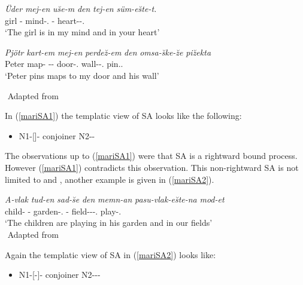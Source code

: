 \begin{exe}
    \ex \label{mariSA1}
    \begin{xlist}
        \ex
        \gll
        \textit{Üder} \textit{mej-en} \textit{u\u{s}e-m} \textit{den} \textit{tej-en} \textit{süm-e\u{s}te-t.} \\ girl {\First}{\Sg}-{\Gen} mind-{\Poss}.{\First}{\Sg} {\And} {\Second}{\Sg}-{\Gen} heart-{\Iness}-{\Second}{\Sg}.{\Poss} \\
        \glt `The girl is in my mind and in your heart'
        
        \ex 
        \gll 
        \textit{Pjötr} \textit{kart-em} \textit{mej-en} \textit{perde\u{z}-em} \textit{den} \textit{omsa-\u{s}ke-\u{z}e} \textit{pi\u{z}ekta} \\ Peter map-{\Acc} {\First}{\Sg}-{\Pron}-{\Gen} door-{\Poss}.{\First}{\Sg} {\And} wall-{\Ill}-{\Third}{\Sg}.{\Poss} pin.{\Third}{\Sg}.{\Prs} \\
        \glt `Peter pins maps to my door and his wall'
    \end{xlist}
    ${}$ \hfill Adapted from \cite{guseva2017postsyntactic}
\end{exe}

In (\ref{mariSA1}) the templatic view of SA looks like the following:
\begin{itemize}
    \item N1-[{\Lcase}]-{\Poss} conjoiner N2-{\Lcase}-{\Poss}
\end{itemize}

The observations up to (\ref{mariSA1}) were that SA is a rightward bound process. However (\ref{mariSA1}) contradicts this observation. This non-rightward SA is not limited to {\Poss} and {\Lcase}, another example is given in (\ref{mariSA2}).
\begin{exe}
    \ex \label{mariSA2}
    \gll 
    \textit{A-vlak} \textit{tud-en} \textit{sad-\u{s}e} \textit{den} \textit{memn-an} \textit{pasu-vlak-e\u{s}te-na} \textit{mod-et} \\ child-{\Pl} {\Third}{\Sg}-{\Gen} garden-{\Third}{\Sg}.{\Poss} {\And} {\First}{\Pl}-{\Gen} field-{\Pl}-{\Iness}-{\First}{\Pl}.{\Poss} play-{\Third}{\Pl}.{\Prs} \\
    \glt `The children are playing in his garden and in our fields'  \\
    ${}$ \hfill Adapted from \cite{guseva2017postsyntactic}
\end{exe}

Again the templatic view of SA in (\ref{mariSA2}) looks like:
\begin{itemize}
    \item N1-[{\Pl}-{\Iness}]-{\Poss} conjoiner N2-{\Pl}-{\Iness}-{\Poss}
\end{itemize}


